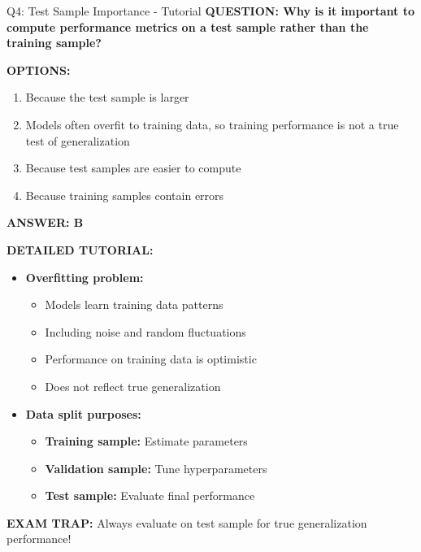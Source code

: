\documentclass[8pt]{beamer}
\begin{document}
	\begin{frame}{Q4: Test Sample Importance - Tutorial}
		\fontsize{6.5}{7.5}\selectfont
		\textbf{QUESTION: Why is it important to compute performance metrics on a test sample rather than the training sample?}
		
		\vspace{0.1cm}
		\textbf{OPTIONS:}
		\begin{enumerate}
			\item Because the test sample is larger
			\item Models often overfit to training data, so training performance is not a true test of generalization
			\item Because test samples are easier to compute
			\item Because training samples contain errors
		\end{enumerate}
		
		\vspace{0.1cm}
		\textcolor{myblue}{\textbf{ANSWER: B}}
		
		\vspace{0.1cm}
		\textbf{DETAILED TUTORIAL:}
		\begin{itemize}
			\item \textbf{Overfitting problem:}
			\begin{itemize}
				\item Models learn training data patterns
				\item Including noise and random fluctuations
				\item Performance on training data is optimistic
				\item Does not reflect true generalization
			\end{itemize}
			\item \textbf{Data split purposes:}
			\begin{itemize}
				\item \textbf{Training sample:} Estimate parameters
				\item \textbf{Validation sample:} Tune hyperparameters
				\item \textbf{Test sample:} Evaluate final performance
			\end{itemize}
		\end{itemize}
		
		\textcolor{myred}{\textbf{EXAM TRAP:}} Always evaluate on \textcolor{myblue}{test sample} for true generalization performance!
	\end{frame}
	
\end{document}
